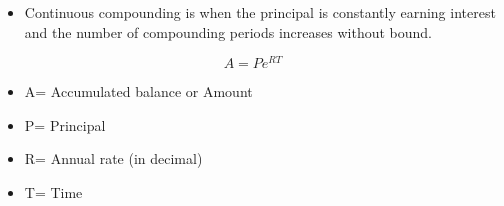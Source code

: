 \documentclass{article}
\begin{document}
\begin{itemize}
	\item Continuous compounding is when the principal is constantly earning interest and the number of compounding periods increases without bound.
\end{itemize}
\begin{equation}
A = Pe^{RT}
\end{equation}
\begin{itemize}
	\item A= Accumulated balance or Amount
	\item P= Principal
	\item R= Annual rate (in decimal)
	\item T= Time
\end{itemize}
\end{document}
